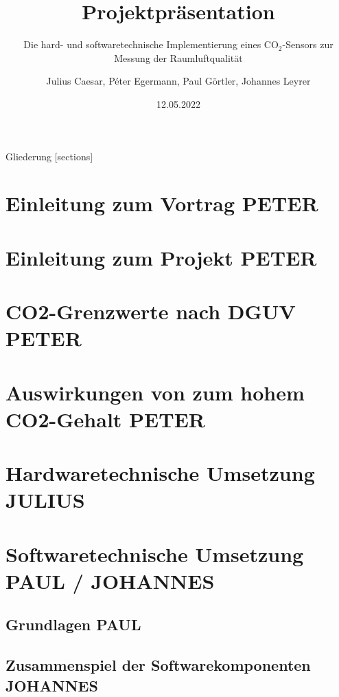 \documentclass[10pt,ngerman]{beamer}
\title{Projektpräsentation}
\date{12.05.2022}
\author{Julius Caesar, Péter Egermann, Paul Görtler, Johannes Leyrer}
\institute{BSZ für Elektrotechnik Dresden -- IT20/2}
\subtitle{Die hard- und softwaretechnische Implementierung eines CO$_2$-Sensors zur Messung der Raumluftqualität}
\begin{document}
\maketitle

\begin{frame}{Gliederung}
  [sections]
  \tableofcontents[hideallsubsections]
\end{frame}

\section{Einleitung zum Vortrag PETER}

\section{Einleitung zum Projekt PETER}

\section{CO2-Grenzwerte nach DGUV PETER}

\section{Auswirkungen von zum hohem CO2-Gehalt PETER}

\section{Hardwaretechnische Umsetzung JULIUS}

\section{Softwaretechnische Umsetzung PAUL / JOHANNES}

\subsection{Grundlagen PAUL}

\subsection{Zusammenspiel der Softwarekomponenten JOHANNES}
\end{document}

